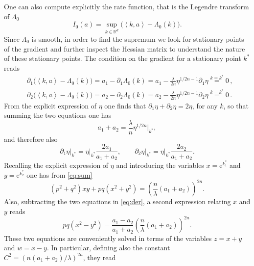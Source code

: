 \documentclass[a4paper,11pt]{article}
\numberwithin{equation}{section}
\begin{document}
One can also compute explicitly the rate function, that is the Legendre transform of $\Lambda_0$
\begin{equation}
    I_0(a)= \sup_{k \in \mathbb{R}^d}\Big( \left\langle k, a \right\rangle - \Lambda_0(k) \Big).
\end{equation}
Since $\Lambda_0$ is smooth, in order to find the supremum we look for stationary points of the gradient and further inspect the Hessian matrix to understand the nature of these stationary points.
The condition on the gradient for a stationary point $k^*$ reads
\begin{align*}
    &\partial_1 \Big( \left\langle k, a \right\rangle - \Lambda_0(k) \Big) = a_1 - \partial_1 \Lambda_0(k) = a_1 - \frac{\lambda}{2n} \eta^{1/2n - 1} \partial_1 \eta \overset{k=k^*}{=} 0 \,,\\
    &\partial_2 \Big( \left\langle k, a \right\rangle - \Lambda_0(k) \Big) = a_2 - \partial_2 \Lambda_0(k) = a_2 - \frac{\lambda}{2n} \eta^{1/2n - 1} \partial_2 \eta \overset{k=k^*}{=} 0 \,.
\end{align*}
From the explicit expression of $\eta$ one finds that $\partial_1 \eta + \partial_2 \eta = 2 \eta$, for any $k$, so that summing the two equations one has
\begin{equation}\label{eq:sum}
    a_1 + a_2 = \frac{\lambda}{n} \eta^{1/2n} \Big\vert_{k^*} ,
\end{equation}
and therefore also
\begin{equation}\label{eq:der}
    \partial_1 \eta \big\vert_{k^*}  = \eta \big\vert_{k^*}  \frac{2 a_1}{a_1 + a_2} , \qquad \partial_2 \eta \big\vert_{k^*}  = \eta \big\vert_{k^*}  \frac{2 a_2}{a_1 + a_2}.
\end{equation}
Recalling the explicit expression of $\eta$ and introducing the variables $x= \mathrm{e}^{k_1^*}$ and $y=\mathrm{e}^{k_2^*}$ one has from \eqref{eq:sum}
\begin{equation}
    (p^2 + q^2) xy + pq (x^2 + y^2) = \left( \frac{n}{\lambda} (a_1 + a_2) \right)^{2n}.
\end{equation}
Also, subtracting the two equations in \eqref{eq:der}, a second expression relating $x$ and $y$ reads
\begin{equation}
    pq (x^2 - y^2) = \frac{a_1-a_2}{a_1+a_2} \left( \frac{n}{\lambda} (a_1 + a_2) \right)^{2n}.
\end{equation}
These two equations are conveniently solved in terms of the variables $z=x+y$ and $w=x-y$. In particular, defining also the constant $C^2=(n(a_1+a_2)/\lambda)^{2n}$, they read
\end{document}
